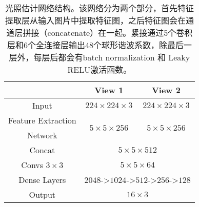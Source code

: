 \begin{table}[htbp]
    \centering
    \caption[光照估计网络结构]{
        \label{table:cnn}
        光照估计网络结构。该网络分为两个部分，首先特征提取层从输入图片中提取特征图，之后特征图会在通道层拼接（concatenate）在一起。紧接通过5个卷积层和6个全连接层输出48个球形谐波系数，除最后一层外，每层后都会有batch normalization 和 Leaky RELU激活函数。
    }
    \begin{tabular}{c|c|c} 
    \hline
    ~           &    View 1 & View 2    \\
    \hline
    Input       &   $224\times224\times3$  &    $224\times224\times3$ \\
    \hline
    Feature Extraction & \multirow{2}{*}{$5\times5\times256$} & \multirow{2}{*}{$5\times5\times256$}\\
    Network&~&~\\
    \hline
    Concat & \multicolumn{2}{c}{$5\times 5\times 512$}     \\
    \hline
    Convs $3\times3$     & \multicolumn{2}{c}{$5\times5\times64$}\\
    \hline
    Dense Layers          & \multicolumn{2}{c}{$2048$->$1024$->$512$->$256$->$128$}\\
    \hline
    Output      & \multicolumn{2}{c}{$16\times3$}\\
    \hline
    \end{tabular}
\end{table}